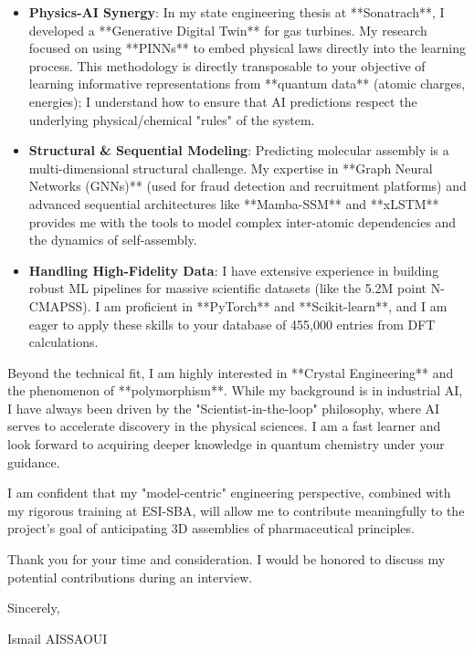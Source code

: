 \documentclass[11pt,a4paper]{article}
\begin{document}
\begin{itemize}
    \item \textbf{Physics-AI Synergy}: In my state engineering thesis at **Sonatrach**, I developed a **Generative Digital Twin** for gas turbines. My research focused on using **PINNs** to embed physical laws directly into the learning process. This methodology is directly transposable to your objective of learning informative representations from **quantum data** (atomic charges, energies); I understand how to ensure that AI predictions respect the underlying physical/chemical "rules" of the system.
    \item \textbf{Structural \& Sequential Modeling}: Predicting molecular assembly is a multi-dimensional structural challenge. My expertise in **Graph Neural Networks (GNNs)** (used for fraud detection and recruitment platforms) and advanced sequential architectures like **Mamba-SSM** and **xLSTM** provides me with the tools to model complex inter-atomic dependencies and the dynamics of self-assembly.
    \item \textbf{Handling High-Fidelity Data}: I have extensive experience in building robust ML pipelines for massive scientific datasets (like the 5.2M point N-CMAPSS). I am proficient in **PyTorch** and **Scikit-learn**, and I am eager to apply these skills to your database of 455,000 entries from DFT calculations.
\end{itemize}

Beyond the technical fit, I am highly interested in **Crystal Engineering** and the phenomenon of **polymorphism**. While my background is in industrial AI, I have always been driven by the "Scientist-in-the-loop" philosophy, where AI serves to accelerate discovery in the physical sciences. I am a fast learner and look forward to acquiring deeper knowledge in quantum chemistry under your guidance.

I am confident that my "model-centric" engineering perspective, combined with my rigorous training at ESI-SBA, will allow me to contribute meaningfully to the project's goal of anticipating 3D assemblies of pharmaceutical principles.

Thank you for your time and consideration. I would be honored to discuss my potential contributions during an interview.

\bigskip

\noindent Sincerely,

\bigskip

\noindent Ismail AISSAOUI
\end{document}
